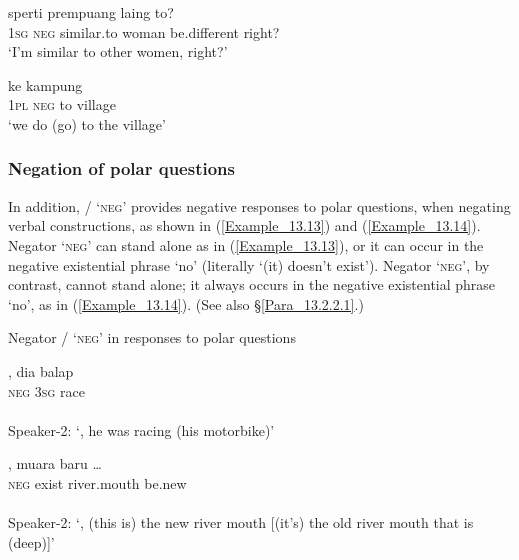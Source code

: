 \ea
\label{Example_13.11}
 {} {sperti} {prempuang} {laing} {to?}\\ %
 \textsc{1sg}  \textsc{neg}  similar.to  woman  be.different  right?\\
\glt 
‘I’m  similar to other women, right?’ \textstyleExampleSource{[081011-023-Cv.0173]}
\z

\ea
\label{Example_13.12}
 {} {ke} {kampung}\\ %
 \textsc{1pl}  \textsc{neg}  to  village\\
\glt
‘we do  (go) to the village’ \textstyleExampleSource{[080917-003a-CvEx.0048]}
\z

\subsubsection[Negation of polar questions]{Negation of polar questions}
\label{Para_13.1.1.4}
In addition, / ‘\textsc{neg}’ provides negative responses to polar questions, when negating verbal constructions, as shown in (\ref{Example_13.13}) and (\ref{Example_13.14}). Negator  ‘\textsc{neg}’ can stand alone as in (\ref{Example_13.13}), or it can occur in the negative existential phrase  ‘no’ (literally ‘(it) doesn’t exist’). Negator  ‘\textsc{neg}’, by contrast, cannot stand alone; it always occurs in the negative existential phrase  ‘no’, as in (\ref{Example_13.14}). (See also §\ref{Para_13.2.2.1}.)


\begin{styleExampleTitle}
Negator / ‘\textsc{neg}’ in responses to polar questions
\end{styleExampleTitle}

\ea
\label{Example_13.13}
 {,} {dia} {balap}\\ %
 {}  \textsc{neg}  \textsc{3sg}  race\\
\\
Speaker-2: ‘, he was racing (his motorbike)’ \textstyleExampleSource{[081014-013-NP.0003-0004]}
\z

\ea
\label{Example_13.14}
 {} {,} {muara} {baru} {\ldots}\\ %
 {}  \textsc{neg}  exist  river.mouth  be.new  \\
\\
Speaker-2: ‘, (this is) the new river mouth [(it’s) the old river mouth that is (deep)]’ \textstyleExampleSource{[080927-003-Cv.0010-0011]}
\z

